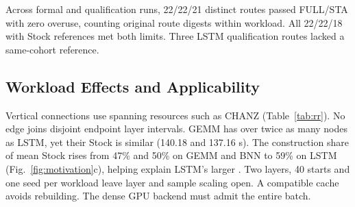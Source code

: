 Across formal and qualification runs, 22/22/21 distinct routes passed FULL/STA with zero overuse, counting original route digests within workload. All 22/22/18 with Stock references met both limits. Three LSTM qualification routes lacked a same-cohort reference.
\subsection{Workload Effects and Applicability}
Vertical connections use spanning resources such as CHANZ (Table~\ref{tab:rr}). No edge joins disjoint endpoint layer intervals. GEMM has over twice as many nodes as LSTM, yet their Stock \constructiontime{} is similar (140.18 and 137.16 s). The construction share of mean Stock \processtime{} rises from 47\% and 50\% on GEMM and BNN to 59\% on LSTM (Fig.~\ref{fig:motivation}c), helping explain LSTM's larger \processspeedup{}. Two layers, 40 starts and one seed per workload leave layer and sample scaling open. A compatible cache avoids rebuilding. The dense GPU backend must admit the entire batch.
